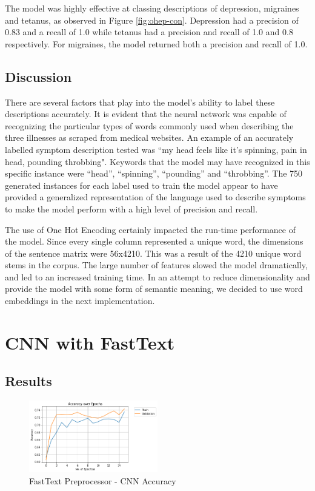 \documentclass[12pt]{report}
\begin{document}
The model was highly effective at classing descriptions of
depression, migraines and tetanus, as observed in Figure \ref{fig:ohep-con}. 
Depression had a precision of 0.83 and a
recall of 1.0 while tetanus had a precision and recall of 1.0 and 0.8 respectively.
For migraines, the model returned both a precision and recall of 1.0.

\subsection{Discussion}
There are several factors that play into the model's ability to label these descriptions
accurately. It is evident that the neural network was capable of recognizing the particular
types of words commonly used when describing the three illnesses as scraped from medical
websites. An example of an accurately labelled symptom description tested was ``my head
feels like it's spinning, pain in head, pounding throbbing". Keywords that the model
may have recognized in this specific instance were “head”, “spinning”, “pounding” and
“throbbing”. The 750 generated instances for each label used to train the model appear to
have provided a generalized representation of the language used to describe symptoms to make
the model perform with a high level of precision and recall.

The use of One Hot Encoding certainly impacted the run-time performance of the model.
Since every single column represented a unique word, the dimensions of the sentence matrix
were 56x4210. This was a result of the 4210 unique word stems in the corpus. The large
number of features slowed the model dramatically, and led to an increased training time.
In an attempt to reduce dimensionality and provide the model with some form of semantic
meaning, we decided to use word embeddings in the next implementation.

\section{CNN with FastText}

\subsection{Results}

\begin{figure}[H]
	\centering
	\includegraphics[width=0.5\textwidth]{accuracy-1.png}
	\caption{FastText Preprocessor - CNN Accuracy}
	\label{fig:ft-acc}
\end{figure}
\end{document}
